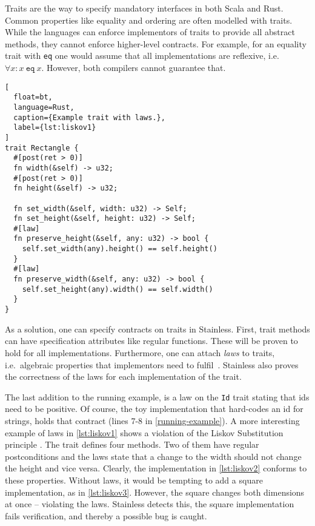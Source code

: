 Traits are the way to specify mandatory interfaces in both Scala and Rust.
Common properties like equality and ordering are often modelled with traits.
While the languages can enforce implementors of traits to provide all abstract
methods, they cannot enforce higher-level contracts. For example, for an
equality trait with \texttt{eq} one would assume that all implementations are
reflexive, i.e. $\forall x: x~\mathtt{eq}~x$. However, both compilers cannot
guarantee that.

\begin{lstlisting}[
  float=bt,
  language=Rust,
  caption={Example trait with laws.},
  label={lst:liskov1}
]
trait Rectangle {
  #[post(ret > 0)]
  fn width(&self) -> u32;
  #[post(ret > 0)]
  fn height(&self) -> u32;

  fn set_width(&self, width: u32) -> Self;
  fn set_height(&self, height: u32) -> Self;
  #[law]
  fn preserve_height(&self, any: u32) -> bool {
    self.set_width(any).height() == self.height()
  }
  #[law]
  fn preserve_width(&self, any: u32) -> bool {
    self.set_height(any).width() == self.width()
  }
}
\end{lstlisting}


As a solution, one can specify contracts on traits in Stainless. First, trait
methods can have specification attributes like regular functions. These will be
proven to hold for all implementations. Furthermore, one can attach \emph{laws}
to traits, i.e.~algebraic properties that implementors need to
fulfil~\cite[section "Specifying Algebraic Properties"]{stainless-doc}.
Stainless also proves the correctness of the laws for each implementation of the
trait.

The last addition to the running example, is a law on the \lstinline!Id! trait
stating  that ids need to be positive. Of course, the toy implementation that
hard-codes an id for strings, holds that contract (lines 7-8 in
\autoref{running-example}). A more interesting example of laws in
\autoref{lst:liskov1} shows a violation of the  Liskov Substitution principle
\cite{liskov}. The trait defines four methods. Two of them have regular
postconditions and the laws state that a change to the width should not change
the height and vice versa. Clearly, the implementation in \autoref{lst:liskov2}
conforms to these properties. Without laws, it would be tempting to add a square
implementation, as in \autoref{lst:liskov3}. However, the square changes both
dimensions at once -- violating the laws. Stainless detects this, the square
implementation fails verification, and thereby a possible bug is caught.

